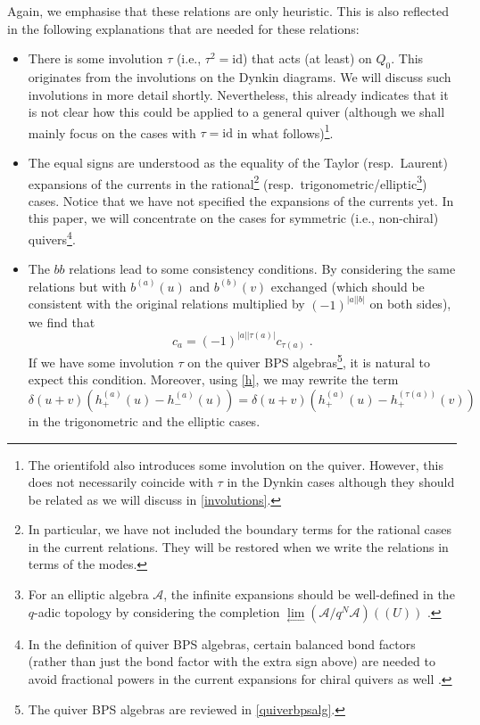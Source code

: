 \documentclass[11pt]{article}
\numberwithin{equation}{section}
\numberwithin{figure}{section}
\numberwithin{table}{section}
\begin{document}
Again, we emphasise that these relations are only heuristic. This is also reflected in the following explanations that are needed for these relations:
\begin{itemize}
	\item There is some involution $\tau$ (i.e., $\tau^2=\mathrm{id}$) that acts (at least) on $Q_0$. This originates from the involutions on the Dynkin diagrams. We will discuss such involutions in more detail shortly. Nevertheless, this already indicates that it is not clear how this could be applied to a general quiver (although we shall mainly focus on the cases with $\tau=\mathrm{id}$ in what follows)\footnote{The orientifold also introduces some involution on the quiver. However, this does not necessarily coincide with $\tau$ in the Dynkin cases although they should be related as we will discuss in \cref{involutions}.}.
	\item The equal signs are understood as the equality of the Taylor (resp.~Laurent) expansions of the currents in the rational\footnote{In particular, we have not included the boundary terms for the rational cases in the current relations. They will be restored when we write the relations in terms of the modes.} (resp.~trigonometric/elliptic\footnote{For an elliptic algebra $\mathcal{A}$, the infinite expansions should be well-defined in the $q$-adic topology by considering the completion $\lim\limits_{\leftarrow}\left(\mathcal{A}/q^N\mathcal{A}\right)(\!(U)\!)$ \cite{Foda:1994xm,Konno:2016fmh,Konno:2021zvl}.}) cases. Notice that we have not specified the expansions of the currents yet. In this paper, we will concentrate on the cases for symmetric (i.e., non-chiral) quivers\footnote{In the definition of quiver BPS algebras, certain balanced bond factors (rather than just the bond factor with the extra sign above) are needed to avoid fractional powers in the current expansions for chiral quivers as well \cite{Galakhov:2021vbo}.}.
	\item The $bb$ relations lead to some consistency conditions. By considering the same relations but with $b^{(a)}(u)$ and $b^{(b)}(v)$ exchanged (which should be consistent with the original relations multiplied by $(-1)^{|a||b|}$ on both sides), we find that
	\begin{equation}
		c_a=(-1)^{|a||\tau(a)|}c_{\tau(a)}\;.
	\end{equation}
	If we have some involution $\tau$ on the quiver BPS algebras\footnote{The quiver BPS algebras are reviewed in \cref{quiverbpsalg}.}, it is natural to expect this condition. Moreover, using \eqref{h}, we may rewrite the term $\delta(u+v)\left(h^{(a)}_+(u)-h^{(a)}_-(u)\right)=\delta(u+v)\left(h^{(a)}_+(u)-h^{(\tau(a))}_+(v)\right)$ in the trigonometric and the elliptic cases.

\end{itemize}
\end{document}
